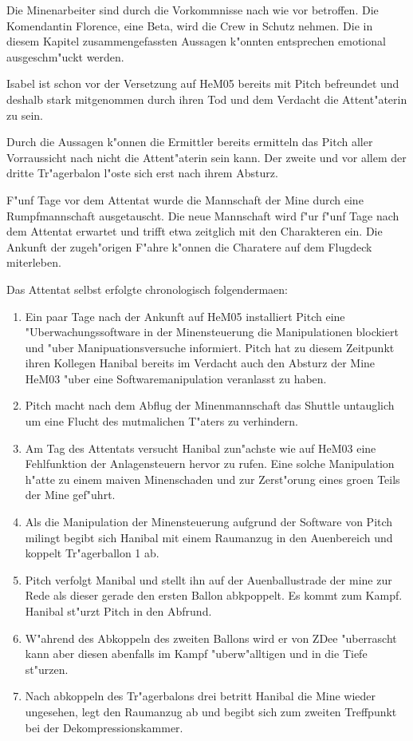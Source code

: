 \begin{remarks}
	Die Minenarbeiter sind durch die Vorkommnisse nach wie vor betroffen. Die Komendantin Florence, eine Beta, wird die Crew in Schutz nehmen. Die in diesem Kapitel zusammengefassten Aussagen k"onnten entsprechen emotional ausgeschm"uckt werden. 

	Isabel ist schon vor der Versetzung auf HeM05 bereits mit Pitch befreundet und deshalb stark mitgenommen durch ihren Tod und dem Verdacht die Attent"aterin zu sein.

	Durch die Aussagen k"onnen die Ermittler bereits ermitteln das Pitch aller Vorraussicht nach nicht die Attent"aterin sein kann. Der zweite und vor allem der dritte Tr"agerbalon l"oste sich erst nach ihrem Absturz.		
\end{remarks}


F"unf Tage vor dem Attentat wurde die Mannschaft der Mine durch eine Rumpfmannschaft ausgetauscht. Die neue Mannschaft wird f"ur f"unf Tage nach dem Attentat erwartet und trifft etwa zeitglich mit den Charakteren ein. Die Ankunft der zugeh"origen F"ahre k"onnen die Charatere auf dem Flugdeck miterleben.

Das Attentat selbst erfolgte chronologisch folgenderma\3en:

\begin{enumerate}
	\item Ein paar Tage nach der Ankunft auf HeM05 installiert Pitch eine "Uberwachungssoftware in der Minensteuerung die Manipulationen blockiert und "uber Manipuationsversuche informiert. Pitch hat zu diesem Zeitpunkt ihren Kollegen Hanibal bereits im Verdacht auch den Absturz der Mine HeM03 "uber eine Softwaremanipulation veranlasst zu haben.
	\item Pitch macht nach dem Abflug der Minenmannschaft das Shuttle untauglich um eine Flucht des mutma\3lichen T"aters zu verhindern.
	\item Am Tag des Attentats versucht Hanibal zun"achste wie auf HeM03 eine Fehlfunktion der Anlagensteuern hervor zu rufen. Eine solche Manipulation h"atte zu einem ma\3iven Minenschaden und zur Zerst"orung eines gro\3en Teils der Mine gef"uhrt.
	\item Als die Manipulation der Minensteuerung aufgrund der Software von Pitch mi\3lingt begibt sich Hanibal mit einem Raumanzug in den Au\3enbereich und koppelt Tr"agerballon 1 ab.
	\item Pitch verfolgt Manibal und stellt ihn auf der Au\3enballustrade der mine zur Rede als dieser gerade den ersten Ballon abkpoppelt. Es kommt zum Kampf. Hanibal st"urzt Pitch in den Abfrund.
	\item W"ahrend des Abkoppeln des zweiten Ballons wird er von ZDee "uberrascht kann aber diesen abenfalls im Kampf "uberw"alltigen und in die Tiefe st"urzen.
	\item Nach abkoppeln des Tr"agerbalons drei betritt Hanibal die Mine wieder ungesehen, legt den Raumanzug ab und begibt sich zum zweiten Treffpunkt bei der Dekompressionskammer.
\end{enumerate}


